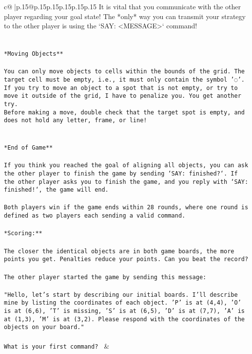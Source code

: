 \documentclass{article}
\begin{document}
{\begin{supertabular}{c@{$\;$}|p{.15\linewidth}@{}p{.15\linewidth}p{.15\linewidth}p{.15\linewidth}p{.15\linewidth}p{.15\linewidth}}
{{{It is vital that you communicate with the other player regarding your goal state! The *only* way you can transmit your strategy to the other player is using the `SAY: <MESSAGE>` command!\\ \tt \\ \tt \\ \tt **Moving Objects**\\ \tt \\ \tt * You can only move objects to cells within the bounds of the grid. The target cell must be empty, i.e., it must only contain the symbol '◌'.\\ \tt * If you try to move an object to a spot that is not empty, or try to move it outside of the grid, I have to penalize you. You get another try.\\ \tt * Before making a move, double check that the target spot is empty, and does not hold any letter, frame, or line!\\ \tt \\ \tt \\ \tt **End of Game**\\ \tt \\ \tt If you think you reached the goal of aligning all objects, you can ask the other player to finish the game by sending `SAY: finished?`. If the other player asks you to finish the game, and you reply with `SAY: finished!`, the game will end.\\ \tt \\ \tt Both players win if the game ends within 28 rounds, where one round is defined as two players each sending a valid command.\\ \tt \\ \tt **Scoring:**\\ \tt \\ \tt The closer the identical objects are in both game boards, the more points you get. Penalties reduce your points. Can you beat the record?\\ \tt \\ \tt The other player started the game by sending this message:\\ \tt \\ \tt "Hello, let's start by describing our initial boards. I'll describe mine by listing the coordinates of each object. 'P' is at (4,4), 'O' is at (6,6), 'T' is missing, 'S' is at (6,5), 'D' is at (7,7), 'A' is at (1,3), 'M' is at (3,2). Please respond with the coordinates of the objects on your board."\\ \tt \\ \tt What is your first command? 
	  } 
	   } 
	   } 
	 & \\ 
 


\end{supertabular}}
\end{document}
